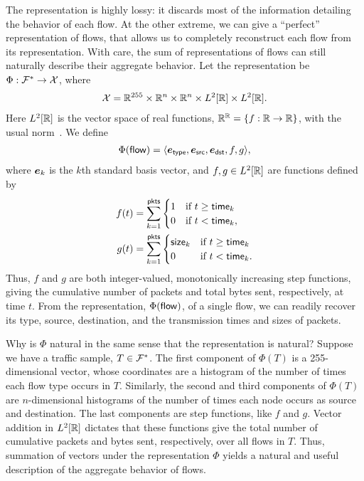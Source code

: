 \documentclass[twocolumn,final]{svjour3}
\begin{document}
The  representation is highly lossy: it discards most of the information detailing the behavior of each flow.
At the other extreme, we can give a ``perfect'' representation of flows, that allows us to completely reconstruct each flow from its representation.
With care, the sum of representations of flows can still naturally describe their aggregate behavior.
Let the representation be $\Phi: \mathcal{F}^* \to \mathcal{X}$, where
\begin{align}
\mathcal{X} = \mathbb{R}^{255} \times \mathbb{R}^n \times \mathbb{R}^n \times L^2[\mathbb{R}] \times L^2[\mathbb{R}].
\end{align}
Here $L^2[\mathbb{R}]$ is the vector space of real functions, $\mathbb{R}^{\mathbb{R}}={\left\{f: \mathbb{R} \to \mathbb{R}\right\}}$, with the usual norm~\cite{Rudin87}.
We define
\begin{align}
\Phi(\flow) = \tuple{\e_\type,\e_\src,\e_\dst,f,g},
\end{align}
where $\e_k$ is the $k$th standard basis vector, and $f,g \in L^2[\mathbb{R}]$ are functions defined by
\begin{align}
f(t) &= \sum_{k=1}^{\text{\textsf{pkts}}}
  \begin{cases}
    1 & \text{if $t \ge \text{\textsf{time}}_k$} \\
    0 & \text{if $t <   \text{\textsf{time}}_k$},
  \end{cases} \\
g(t) &= \sum_{k=1}^{\text{\textsf{pkts}}}
  \begin{cases}
    \text{\textsf{size}}_k & \text{if $t \ge \text{\textsf{time}}_k$} \\
    0       & \text{if $t <   \text{\textsf{time}}_k$}.
  \end{cases}
\end{align}
Thus, $f$ and $g$ are both integer-valued, monotonically increasing step functions, giving the cumulative number of packets and total bytes sent, respectively, at time $t$.
From the representation, $\Phi(\text{\textsf{flow}})$, of a single flow, we can readily recover its type, source, destination, and the transmission times and sizes of packets.

Why is $\Phi$ natural in the same sense that the  representation is natural?
Suppose we have a traffic sample, $T\in\mathcal{F}^*$.
The first component of $\Phi(T)$ is a 255-dimensional vector, whose coordinates are a histogram of the number of times each flow type occurs in $T$.
Similarly, the second and third components of $\Phi(T)$ are $n$-dimensional histograms of the number of times each node occurs as source and destination.
The last components are step functions, like $f$ and $g$.
Vector addition in $L^2[\mathbb{R}]$ dictates that these functions give the total number of cumulative packets and bytes sent, respectively, over all flows in $T$.
Thus, summation of vectors under the representation $\Phi$ yields a natural and useful description of the aggregate behavior of flows.
\end{document}
